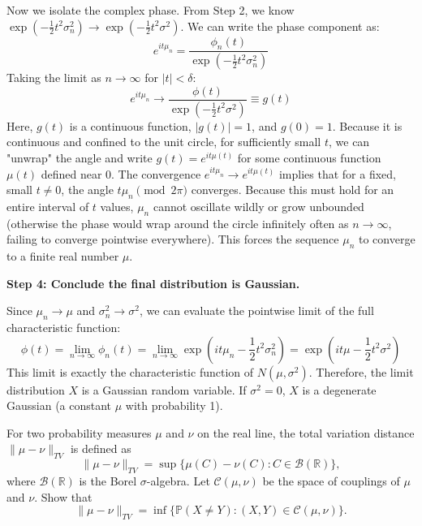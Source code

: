 \begin{solution}
Now we isolate the complex phase. From Step 2, we know $\exp(-\frac{1}{2}t^2\sigma_n^2) \to \exp(-\frac{1}{2}t^2\sigma^2)$.
We can write the phase component as:
\[ e^{it\mu_n} = \frac{\phi_n(t)}{\exp(-\frac{1}{2}t^2\sigma_n^2)} \]
Taking the limit as $n \to \infty$ for $|t| < \delta$:
\[ e^{it\mu_n} \to \frac{\phi(t)}{\exp(-\frac{1}{2}t^2\sigma^2)} \equiv g(t) \]
Here, $g(t)$ is a continuous function, $|g(t)| = 1$, and $g(0) = 1$.
Because it is continuous and confined to the unit circle, for sufficiently small $t$, we can "unwrap" the angle and write $g(t) = e^{it\mu(t)}$ for some continuous function $\mu(t)$ defined near 0.
The convergence $e^{it\mu_n} \to e^{it\mu(t)}$ implies that for a fixed, small $t \neq 0$, the angle $t\mu_n \pmod{2\pi}$ converges.
Because this must hold for an entire interval of $t$ values, $\mu_n$ cannot oscillate wildly or grow unbounded (otherwise the phase would wrap around the circle infinitely often as $n \to \infty$, failing to converge pointwise everywhere). This forces the sequence $\mu_n$ to converge to a finite real number $\mu$.

\textbf{Step 4: Conclude the final distribution is Gaussian.}

Since $\mu_n \to \mu$ and $\sigma_n^2 \to \sigma^2$, we can evaluate the pointwise limit of the full characteristic function:
\[ \phi(t) = \lim_{n \to \infty} \phi_n(t) = \lim_{n \to \infty} \exp\left(it\mu_n - \frac{1}{2}t^2\sigma_n^2\right) = \exp\left(it\mu - \frac{1}{2}t^2\sigma^2\right) \]
This limit is exactly the characteristic function of $N(\mu, \sigma^2)$.
Therefore, the limit distribution $X$ is a Gaussian random variable. If $\sigma^2 = 0$, $X$ is a degenerate Gaussian (a constant $\mu$ with probability 1).
\end{solution}

\begin{exercise}\label{probability:2021:2}
For two probability measures $\mu$ and $\nu$ on the real line, the total variation distance $\|\mu - \nu\|_{TV}$ is defined as
\[
\|\mu - \nu\|_{TV} = \sup\{\mu(C) - \nu(C): C \in \mathcal{B}(\mathbb{R})\},
\]
where $\mathcal{B}(\mathbb{R})$ is the Borel $\sigma$-algebra. Let $\mathcal{C}(\mu, \nu)$ be the space of couplings of $\mu$ and $\nu$. Show that
\[
\|\mu - \nu\|_{TV} = \inf\{\mathbb{P}(X \neq Y): (X,Y) \in \mathcal{C}(\mu, \nu)\}.
\]
\end{exercise}

